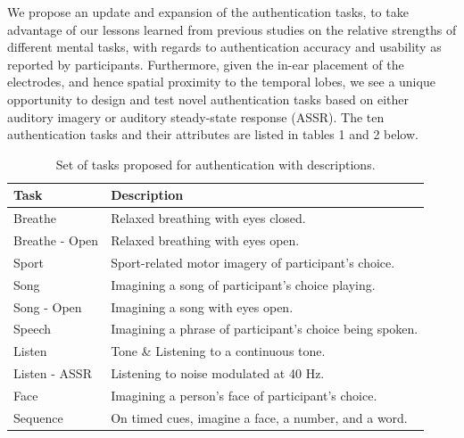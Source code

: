 \documentclass[11pt]{article}
\begin{document}
We propose an update and expansion of the authentication tasks, to take
advantage of our lessons learned from previous studies on the relative strengths
of different mental tasks, with regards to authentication accuracy and usability as
reported by participants. Furthermore, given the in-ear placement of the
electrodes, and hence spatial proximity to the temporal lobes, we see a unique
opportunity to design and test novel authentication tasks based on either auditory
imagery or auditory steady-state response (ASSR). The ten authentication tasks and their
attributes are listed in tables 1 and 2 below.

\begin{table}[h]
\centering
\begin{tabular}{ll}
\textbf{\textbf{Task}} & \textbf{\textbf{Description}}\\
\hline
Breathe & Relaxed breathing with eyes closed.\\
Breathe - Open & Relaxed breathing with eyes open.\\
Sport & Sport-related motor imagery of participant's choice.\\
Song & Imagining a song of participant's choice playing.\\
Song - Open & Imagining a song with eyes open.\\
Speech & Imagining a phrase of participant's choice being spoken.\\
Listen & Tone \& Listening to a continuous tone.\\
Listen - ASSR & Listening to noise modulated at 40 Hz.\\
Face & Imagining a person's face of participant's choice.\\
Sequence & On timed cues, imagine a face, a number, and a word.\\
\hline
\end{tabular}
\caption{Set of tasks proposed for authentication with descriptions.}
\end{table}
\end{document}
